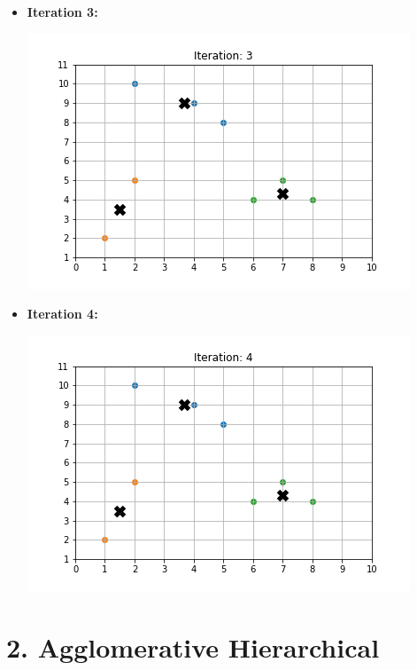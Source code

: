\documentclass[11pt]{article}
\begin{document}
\begin{itemize}
		\item \textbf{Iteration 3:} \\
		\begin{center}
			\includegraphics[scale=0.7]{kmeans_graphs/iteration_3.png}
		\end{center}
		
		\item \textbf{Iteration 4:} \\
		\begin{center}
			\includegraphics[scale=0.7]{kmeans_graphs/iteration_4.png}
		\end{center}
    \end{itemize}
	\newpage
	
	\section*{2. Agglomerative Hierarchical}
\end{document}
